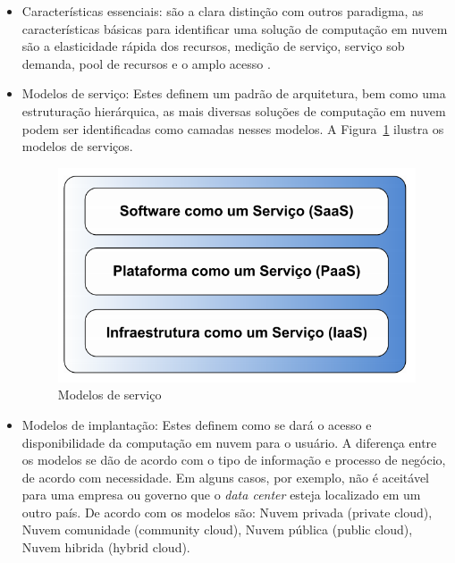 \documentclass[twoside,english,brazilian]{UNISINOSartigo}
\begin{document}
\begin{itemize} 
	\item Características essenciais: são a clara distinção com outros paradigma, as características básicas para identificar uma solução de computação em nuvem são a elasticidade rápida dos recursos, medição de serviço, serviço sob demanda, pool de recursos e o amplo acesso \cite{Moreira2010}.
	\item Modelos de serviço: Estes definem um padrão de arquitetura, bem como uma estruturação hierárquica, as mais diversas soluções de computação em nuvem podem ser identificadas como camadas nesses modelos. A Figura~\ref{fig:saas_paas} ilustra os modelos de serviços.
	\begin{figure}
		\caption{Modelos de serviço}
		\label{fig:saas_paas}
		\centering%
		\begin{minipage}{.4\textwidth}
			\includegraphics[width=\textwidth]{saas_paas}
		\end{minipage}
	\end{figure}
	\item Modelos de implantação: Estes definem como se dará o acesso e disponibilidade da computação em nuvem para o usuário. A diferença entre os modelos se dão de acordo com o tipo de informação e processo de negócio, de acordo com necessidade. Em alguns casos, por exemplo, não é aceitável para uma empresa ou governo que o \textit{data center} esteja localizado em um outro país. De acordo com  os modelos são: Nuvem privada (private cloud), Nuvem comunidade (community cloud), Nuvem pública (public cloud), Nuvem hibrida (hybrid cloud).
 
\end{itemize}
\end{document}
